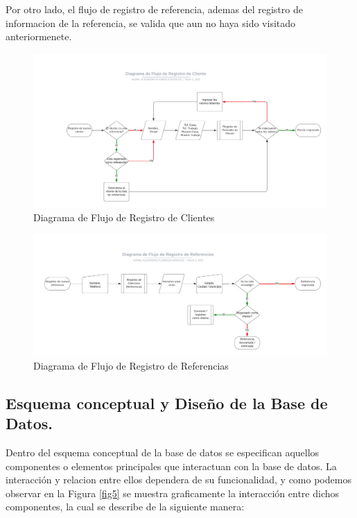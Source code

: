 \documentclass[runningheads]{llncs}
\begin{document}
Por otro lado, el flujo de registro de referencia, ademas del registro de informacion de la referencia, se valida que aun no haya sido visitado anteriormenete.

\begin{figure}[H]
	\centering\captionsetup{width=0.8\textwidth}
	\includegraphics[width=1\textwidth]{figures/diagramas_de_flujo/Flujo de Registro de Cliente.png}
	\caption{Diagrama de Flujo de Registro de Clientes} \label{fig3}
\end{figure}
\begin{figure}[H]
	\centering\captionsetup{width=0.8\textwidth}
	\includegraphics[width=1\textwidth]{figures/diagramas_de_flujo/Flujo de Registro de Referencias.png}
	\caption{Diagrama de Flujo de Registro de Referencias} \label{fig4}
\end{figure}

\subsection{Esquema conceptual y Diseño de la Base de Datos.}
Dentro del esquema conceptual de la base de datos se especifican aquellos componentes o elementos principales que interactuan con la base de datos.
La interacción y relacion entre ellos dependera de su funcionalidad, y como podemos observar en la Figura \ref{fig5} se muestra graficamente la interacción entre dichos componentes, la cual se describe de la siguiente manera:
\end{document}
